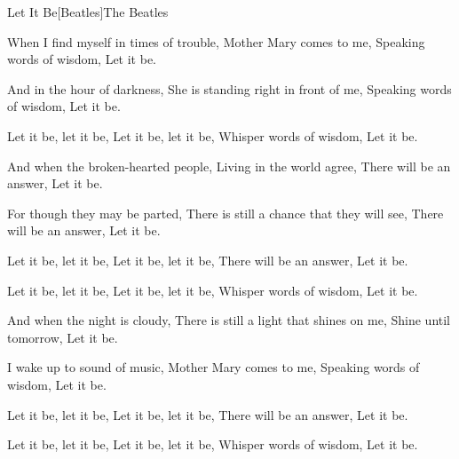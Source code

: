 \documentclass[a4paper,11pt,french]{article}
\begin{document}

\begin{Song}{Let It Be}[Beatles]{The Beatles}
\begin{multicols}{2}

\begin{Verse}
When I find myself in times of trouble,
Mother Mary comes to me,
Speaking words of wisdom,
Let it be.
\espaceInterStrophe

And in the hour of darkness,
She is standing right in front of me, 
Speaking words of wisdom,
Let it be.
\end{Verse}
\espaceInterStrophe

\begin{Chorus}
Let it be, let it be,
Let it be, let it be,
Whisper words of wisdom,
Let it be.
\end{Chorus}
\espaceInterStrophe

\begin{Verse}
And when the broken-hearted people,
Living in the world agree,
There will be an answer,
Let it be.
\espaceInterStrophe

For though they may be parted,
There is still a chance that they will see,
There will be an answer, 
Let it be.
\end{Verse}
\espaceInterStrophe

\begin{Chorus}
Let it be, let it be,
Let it be, let it be,
There will be an answer,
Let it be.
\espaceInterStrophe

Let it be, let it be,
Let it be, let it be,
Whisper words of wisdom,
Let it be.
\end{Chorus}
\espaceInterStrophe

\espaceInterStrophe

\begin{Verse}
And when the night is cloudy,
There is still a light that shines on me,
Shine until tomorrow,
Let it be.
\espaceInterStrophe

I wake up to sound of music,
Mother Mary comes to me,
Speaking words of wisdom,
Let it be.
\end{Verse}
\espaceInterStrophe

\begin{Chorus}
Let it be, let it be,
Let it be, let it be,
There will be an answer,
Let it be.
\espaceInterStrophe

Let it be, let it be,
Let it be, let it be,
Whisper words of wisdom,
Let it be.
\espaceInterStrophe


\end{Chorus}
\end{multicols}
\end{Song}
\end{document}
